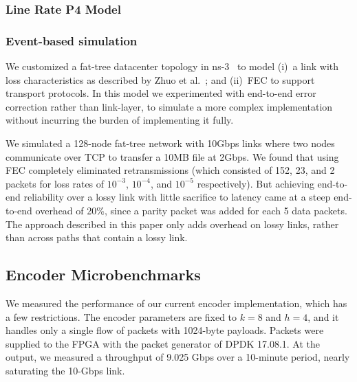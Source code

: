 \subsubsection{Line Rate P4 Model} 




\subsubsection{Event-based simulation}
We customized a fat-tree datacenter topology in ns-3~\cite{ns3-dcn} to
model (i)~a link with loss characteristics as described by Zhuo et
al.~\cite{Zhuo:2017:UMP:3098822.3098849}; and (ii)~FEC to support
transport protocols. In this model we experimented with end-to-end
error correction rather than link-layer, to simulate a more complex
implementation without incurring the burden of implementing it fully.

We simulated a 128-node fat-tree network with 10Gbps links where two
nodes communicate over TCP to transfer a 10MB file at 2Gbps. We found
that using FEC completely eliminated retransmissions (which consisted
  of 152, 23, and 2 packets for loss rates of $10^{-3}$, $10^{-4}$,
and $10^{-5}$ respectively). But achieving end-to-end reliability
over a lossy link with little sacrifice to latency came at a steep
end-to-end overhead of 20\%, since a parity packet was added for each
5 data packets. The approach described in this paper only adds
overhead on lossy links, rather than across paths that contain a
lossy link.


\subsection{Encoder Microbenchmarks}

We measured the performance of our current encoder implementation, which has a
few restrictions.  The encoder parameters are fixed to $k = 8$ and $h = 4$,
and it handles only a single flow of packets with 1024-byte payloads.
Packets were supplied to the FPGA with the packet generator of DPDK 17.08.1.
At the output, we measured a throughput of 9.025 Gbps over a 10-minute period,
nearly saturating the 10-Gbps link.

